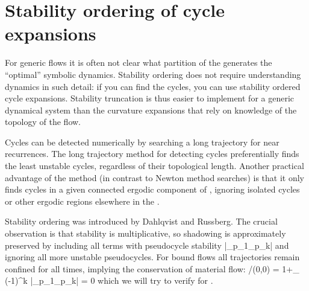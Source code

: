 \renewcommand{\inputfile}{\version\ - edited 2008-06-26 stabOrder}



\section{Stability ordering of cycle expansions}

For generic flows it is often not clear what
partition of the {\statesp} generates the ``optimal''
symbolic dynamics.  Stability ordering
does not require understanding dynamics in such detail:
if you can find the cycles, you can use
stability ordered cycle expansions.
Stability truncation
is thus
easier to implement for
a generic dynamical system than the
curvature expansions  that rely on knowledge of the
topology of the flow. 

Cycles can be detected numerically by
searching a long trajectory for near recurrences.
The long trajectory method for detecting cycles
preferentially finds
the least unstable cycles, regardless of their topological length.
Another practical advantage of the method (in contrast to
Newton method searches)
is that it only finds
cycles in a given connected ergodic component of {\statesp},
ignoring  isolated cycles or other ergodic regions
elsewhere in the {\statesp}.

Stability ordering was introduced by
Dahlqvist and Russberg. The 
crucial observation is that
stability is multiplicative, so shadowing is approximately preserved
by including all terms with pseudocycle stability
\beq
\left|\ExpaEig_{p_1}\cdots\ExpaEig_{p_k}\right| \leq \stabCutoff
{}
and ignoring all more unstable pseudocycles. For bound flows
all trajectories remain confined for
all times, implying the conservation of material flow:
/\zeta(0,0) = 1+\sumprime_\pseudos
		{ (-1)^k \over
		|\ExpaEig_{p_1}\cdots \ExpaEig_{p_k}|} = 0
	\label{prob-cons-zeta}
\eeq
which we will try to verify for \KSe.



